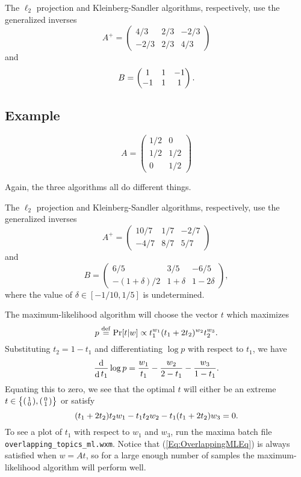 \documentclass{article}
\newcommand{\DefEq}{\stackrel{\mathrm{def}}{=}}
\DeclareMathOperator{\D}{d}
\begin{document}
The \(\ell_2\) projection and Kleinberg-Sandler algorithms, respectively, use the generalized inverses
\[
    A^+ =
    \begin{pmatrix}
         4/3 & 2/3 & -2/3
    \\  -2/3 & 2/3 &  4/3
    \end{pmatrix}
\]
    and
\[
    B =
    \begin{pmatrix}
         1 & 1 & -1
    \\  -1 & 1 &  1
    \end{pmatrix}
    \ldotp
\]

\subsection{Example}

\[
    A =
    \begin{pmatrix}
        1/2 & 0
    \\  1/2 & 1/2
    \\  0   & 1/2
    \end{pmatrix}
\]

Again, the three algorithms all do different things.

The \(\ell_2\) projection and Kleinberg-Sandler algorithms, respectively, use the generalized inverses
\[
    A^+ =
    \begin{pmatrix}
        10/7 & 1/7 & -2/7
    \\  -4/7 & 8/7 &  5/7
    \end{pmatrix}
\]
    and
\[
    B =
    \begin{pmatrix}
        6/5               & 3/5        & -6/5
    \\  -(1 + \delta) / 2 & 1 + \delta & 1 - 2 \delta
    \end{pmatrix}
    ,
\]
where the value of \(\delta \in [-1/10, 1/5]\) is undetermined.

The maximum-likelihood algorithm will choose the vector \(t\) which maximizes
\[ p \DefEq \Pr[ t | w ] \propto t_1^{w_1} (t_1 + 2 t_2)^{w_2} t_2^{w_3} \ldotp \]
Substituting \(t_2 = 1 - t_1\) and differentiating \(\log p\) with respect to \(t_1\), we have
\[ \frac {\D} {\D t_1} \log p = \frac {w_1} {t_1} - \frac {w_2} {2 - t_1} - \frac {w_3} {1 - t_1} \ldotp \]
Equating this to zero, we see that the optimal \(t\) will either be an extreme \(t \in \big\{ \begin{psmallmatrix} 1 \\ 0 \end{psmallmatrix}, \begin{psmallmatrix} 0 \\ 1 \end{psmallmatrix} \big\}\) or satisfy
\begin{equation}
    \label{Eq:OverlappingMLEq}
    (t_1 + 2 t_2) t_2 w_1 - t_1 t_2 w_2 - t_1 (t_1 + 2 t_2) w_3 = 0 \ldotp
\end{equation}
To see a plot of \(t_1\) with respect to \(w_1\) and \(w_3\), run the maxima batch file \texttt{overlapping\_topics\_ml.wxm}.
Notice that (\ref{Eq:OverlappingMLEq}) is always satisfied when \(w = A t\), so for a large enough number of samples the maximum-likelihood algorithm will perform well.

{}

\end{document}
